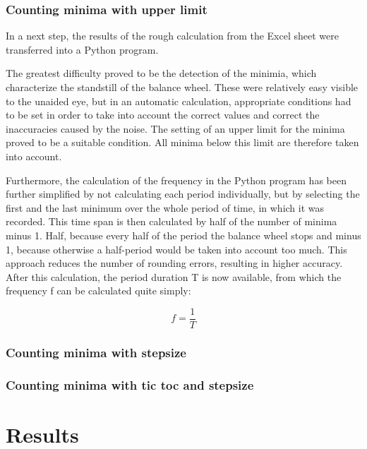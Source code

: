 \documentclass[12pt, a4paper]{report}
\begin{document}
    \subsection{Counting minima with upper limit}
    
    In a next step, the results of the rough calculation from the Excel sheet were transferred into a Python program. 
    
    The greatest difficulty proved to be the detection of the minimia, which characterize the standstill of the balance wheel. These were relatively easy visible to the unaided eye, but in an automatic calculation, appropriate conditions had to be set in order to take into account the correct values and correct the inaccuracies caused by the noise. The setting of an upper limit for the minima proved to be a suitable condition. All minima below this limit are therefore taken into account. 
    
    Furthermore, the calculation of the frequency in the Python program has been further simplified by not calculating each period individually, but by selecting the first and the last minimum over the whole period of time, in which it was recorded. This time span is then calculated by half of the number of minima minus 1. Half, because every half of the period the balance wheel stops and minus 1, because otherwise a half-period would be taken into account too much. This approach reduces the number of rounding errors, resulting in higher accuracy. After this calculation, the period duration T is now available, from which the frequency f can be calculated quite simply: 
    
     \begin{displaymath}
      f = \frac{1}{T}
     \end{displaymath}
     
  \subsection{Counting minima with stepsize}
  
    \subsection{Counting minima with tic toc and stepsize}
    
    \chapter{Results}
    
\end{document}
